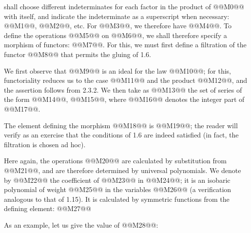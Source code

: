 shall choose different indeterminates for each factor in the product of @@M0@@ with itself, and indicate the indeterminate as a superscript when necessary: @@M1@@, @@M2@@, etc. For @@M3@@, we therefore have @@M4@@. To define the operations @@M5@@ on @@M6@@, we shall therefore specify a morphism of functors: @@M7@@.
For this, we must first define a filtration of the functor @@M8@@ that permits the gluing of 1.6.

We first observe that @@M9@@ is an ideal for the law @@M10@@; for this, functoriality reduces us to the case @@M11@@ and the product @@M12@@, and the assertion follows from 2.3.2. We then take as @@M13@@ the set of series of the form @@M14@@, @@M15@@, where @@M16@@ denotes the integer part of @@M17@@.

The element defining the morphism @@M18@@ is @@M19@@; the reader will verify as an exercise that the conditions of 1.6 are indeed satisfied (in fact, the filtration is chosen ad hoc).

Here again, the operations @@M20@@ are calculated by substitution from @@M21@@, and are therefore determined by universal polynomials. We denote by @@M22@@ the coefficient of @@M23@@ in @@M24@@; it is an isobaric polynomial of weight @@M25@@ in the variables @@M26@@ (a verification analogous to that of 1.15). It is calculated by symmetric functions from the defining element:
@@M27@@

As an example, let us give the value of @@M28@@:
